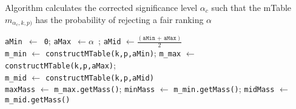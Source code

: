 \begin{algorithm}[h!]
	\caption{Algorithm \algoBinomBinary calculates the corrected significance level $\alpha_c$ such that the mTable $m_{\alpha_c , k, p)}$ has the probability of rejecting a fair ranking $\alpha$}
	\label{alg:binom_binary} %
	\small
	\texttt{aMin $\leftarrow$ 0};
	\texttt{aMax $\leftarrow \alpha$ };
	\texttt{aMid} $\leftarrow \frac{(\texttt{aMin + aMax})}{2}$ \\
	\texttt{m\_min} $\leftarrow$ \texttt{constructMTable(k,p,aMin)}; 
	\texttt{m\_max} $\leftarrow$ \texttt{constructMTable(k,p,aMax)}; \\
	\texttt{m\_mid} $\leftarrow$ \texttt{constructMTable(k,p,aMid)} \\
	\texttt{maxMass} $\leftarrow$ \texttt{m\_max.getMass()};
	\texttt{minMass} $\leftarrow$ \texttt{m\_min.getMass()};
	\texttt{midMass} $\leftarrow$ \texttt{m\_mid.getMass()}\\
	

\end{algorithm}
